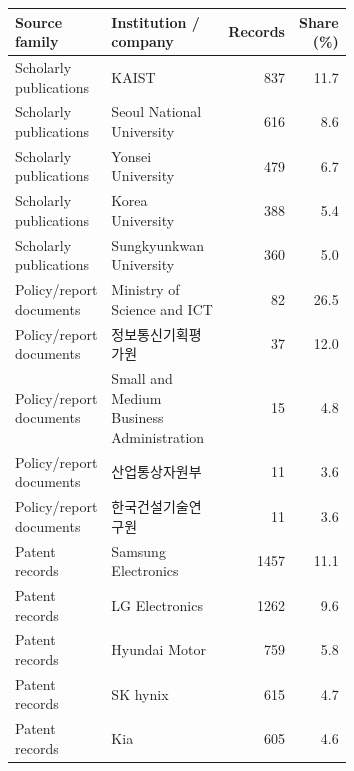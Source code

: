 \begin{tabular}{p{0.24\linewidth}p{0.43\linewidth}rr}
\toprule
Source family & Institution / company & Records & Share (\%) \\
\midrule
Scholarly publications & KAIST & 837 & 11.7 \\
Scholarly publications & Seoul National University & 616 & 8.6 \\
Scholarly publications & Yonsei University & 479 & 6.7 \\
Scholarly publications & Korea University & 388 & 5.4 \\
Scholarly publications & Sungkyunkwan University & 360 & 5.0 \\
Policy/report documents & Ministry of Science and ICT & 82 & 26.5 \\
Policy/report documents & 정보통신기획평가원 & 37 & 12.0 \\
Policy/report documents & Small and Medium Business Administration & 15 & 4.8 \\
Policy/report documents & 산업통상자원부 & 11 & 3.6 \\
Policy/report documents & 한국건설기술연구원 & 11 & 3.6 \\
Patent records & Samsung Electronics & 1457 & 11.1 \\
Patent records & LG Electronics & 1262 & 9.6 \\
Patent records & Hyundai Motor & 759 & 5.8 \\
Patent records & SK hynix & 615 & 4.7 \\
Patent records & Kia & 605 & 4.6 \\
\bottomrule
\end{tabular}
